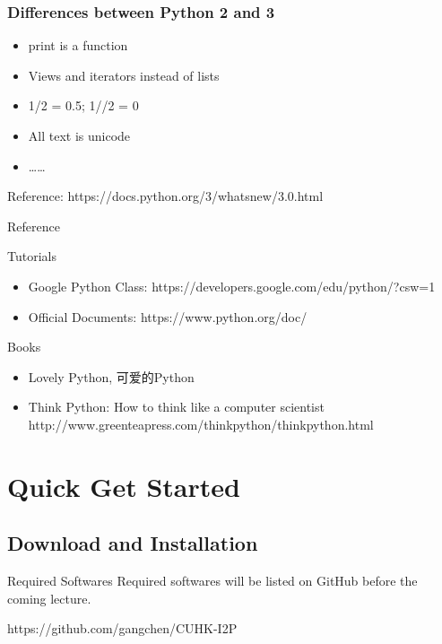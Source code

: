 \documentclass[UTF8]{beamer}
\begin{document}
\begin{frame}
  \frametitle{Differences between Python 2 and 3}
  \begin{itemize}
    \item print is a function
    \item Views and iterators instead of lists
    \item 1/2 = 0.5; 1//2 = 0
    \item All text is unicode
    \item \ldots \ldots
  \end{itemize}
  Reference: https://docs.python.org/3/whatsnew/3.0.html
\end{frame}

\begin{frame}{Reference}
\begin{block}{Tutorials}
\begin{itemize}
  \item Google Python Class: https://developers.google.com/edu/python/?csw=1
  \item Official Documents: https://www.python.org/doc/
\end{itemize}
\end{block}

\begin{block}{Books}
  \begin{itemize}
    \item Lovely Python, 可爱的Python
    \item Think Python: How to think like a computer scientist\\
    http://www.greenteapress.com/thinkpython/thinkpython.html

  \end{itemize}
\end{block}
\end{frame}

\section{Quick Get Started}
\subsection{Download and Installation}
\begin{frame}
\begin{block}{Required Softwares}
  Required softwares will be listed on GitHub before the coming
  lecture.

  https://github.com/gangchen/CUHK-I2P
\end{block}
\end{frame}
\end{document}
